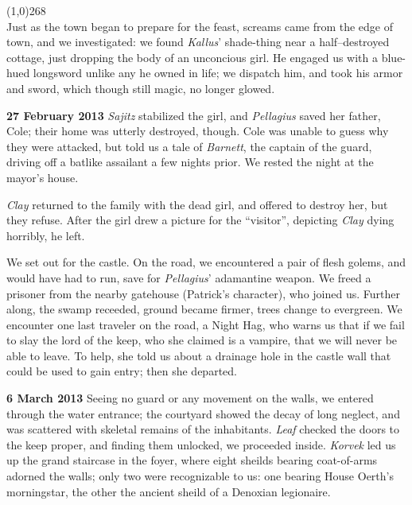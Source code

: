 \documentclass[letterpaper]{article}
\newcommand{\colline}{\noindent\line(1,0){268} \\}
\newcommand{\e}[1]{\emph{#1}}
\newcommand{\B}[1]{\textbf{#1}}
\newenvironment{notesection}[1]
{\noindent {\huge \B{#1}} \par
\vspace{-0.75em}
\colline
\begingroup\fontsize{9pt}{12pt}\selectfont}
{\endgroup}
\begin{document}
\begin{notesection}{Events}
Just as the town began to prepare for the feast, screams came from the edge of town, and we investigated: we found \e{Kallus}' shade-thing near a half--destroyed cottage, just dropping the body of an unconcious girl.  He engaged us with a blue-hued longsword unlike any he owned in life; we dispatch him, and took his armor and sword, which though still magic, no longer glowed.

\B{27 February 2013} \e{Sajitz} stabilized the girl, and \e{Pellagius} saved her father, Cole; their home was utterly destroyed, though.  Cole was unable to guess why they were attacked, but told us a tale of \e{Barnett}, the captain of the guard, driving off a batlike assailant a few nights prior. We rested the night at the mayor's house.

\e{Clay} returned to the family with the dead girl, and offered to destroy her, but they refuse.  After the girl drew a picture for the ``visitor'', depicting \e{Clay} dying horribly, he left.

We set out for the castle. On the road, we encountered a pair of flesh golems, and would have had to run, save for \e{Pellagius}' adamantine weapon.  We freed a prisoner from the nearby gatehouse (Patrick's character), who joined us.  Further along, the swamp receeded, ground became firmer, trees change to evergreen.  We encounter one last traveler on the road, a Night Hag, who warns us that if we fail to slay the lord of the keep, who she claimed is a vampire, that we will never be able to leave. To help, she told us about a drainage hole in the castle wall that could be used to gain entry; then she departed.

\B{6 March 2013} Seeing no guard or any movement on the walls, we entered through the water entrance; the courtyard showed the decay of long neglect, and was scattered with skeletal remains of the inhabitants. \e{Leaf} checked the doors to the keep proper, and finding them unlocked, we proceeded inside.  \e{Korvek} led us up the grand staircase in the foyer, where eight sheilds bearing coat-of-arms adorned the walls; only two were recognizable to us: one bearing House Oerth's morningstar, the other the ancient sheild of a Denoxian legionaire.


\end{notesection}
\end{document}
